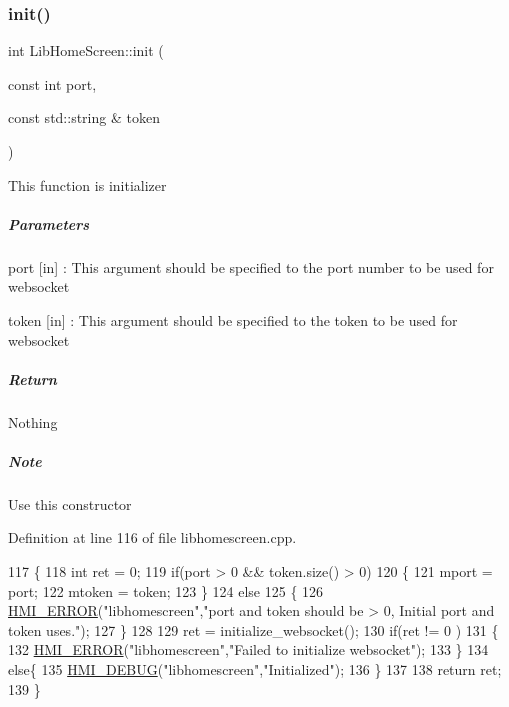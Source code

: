 \subsubsection{\texorpdfstring{init()}{init()}}
{\footnotesize\ttfamily int Lib\+Home\+Screen\+::init (\begin{DoxyParamCaption}\item[{const int}]{port,  }\item[{const std\+::string \&}]{token }\end{DoxyParamCaption})}

This function is initializer

\subparagraph*{Parameters}


\begin{DoxyItemize}
\item port \mbox{[}in\mbox{]} \+: This argument should be specified to the port number to be used for websocket
\item token \mbox{[}in\mbox{]} \+: This argument should be specified to the token to be used for websocket
\end{DoxyItemize}

\subparagraph*{Return}

Nothing

\subparagraph*{Note}

Use this constructor 

Definition at line 116 of file libhomescreen.\+cpp.


\begin{DoxyCode}
117 \{
118     \textcolor{keywordtype}{int} ret = 0;
119     \textcolor{keywordflow}{if}(port > 0 && token.size() > 0)
120     \{
121         mport = port;
122         mtoken = token;
123     \}
124     \textcolor{keywordflow}{else}
125     \{
126         \hyperlink{hmi-debug_8h_a65bb6c7cfe38f8a724beab5059d36fb2}{HMI\_ERROR}(\textcolor{stringliteral}{"libhomescreen"},\textcolor{stringliteral}{"port and token should be > 0, Initial port and token uses."});
127     \}
128 
129     ret = initialize\_websocket();
130     \textcolor{keywordflow}{if}(ret != 0 )
131     \{
132         \hyperlink{hmi-debug_8h_a65bb6c7cfe38f8a724beab5059d36fb2}{HMI\_ERROR}(\textcolor{stringliteral}{"libhomescreen"},\textcolor{stringliteral}{"Failed to initialize websocket"});
133     \}
134     \textcolor{keywordflow}{else}\{
135         \hyperlink{hmi-debug_8h_a0d26d8b8201011dade787236519711c0}{HMI\_DEBUG}(\textcolor{stringliteral}{"libhomescreen"},\textcolor{stringliteral}{"Initialized"});
136     \}
137 
138     \textcolor{keywordflow}{return} ret;
139 \}
\end{DoxyCode}
\mbox{\label{class_lib_home_screen_a608638eb87b2772a3dcc92d8ca8f3596}} 
